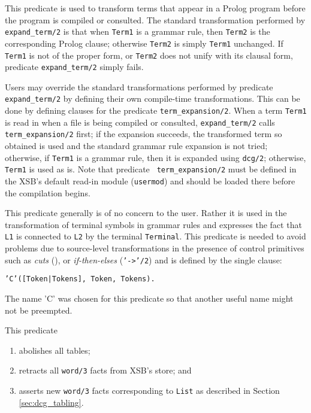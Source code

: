 \begin{description}
    This predicate is used to transform terms that appear in a Prolog program
    before the program is compiled or consulted.
    The standard transformation performed by {\tt expand\_term/2} is that 
    when {\tt Term1} is a grammar rule, then {\tt Term2} is the corresponding
    Prolog clause; otherwise {\tt Term2} is simply {\tt Term1} unchanged. If
    {\tt Term1} is not of the proper form, or {\tt Term2} does not unify with
    its clausal form, predicate {\tt expand\_term/2} simply fails.

    Users may override the standard transformations performed by predicate
    {\tt expand\_term/2} by defining their own compile-time transformations.
    This can be done by defining clauses for the predicate
    {\tt term\_expansion/2}.
    When a term {\tt Term1} is read in when a file is being compiled or 
    consulted, {\tt expand\_term/2} calls {\tt term\_expansion/2} first;
    if the expansion succeeds, the transformed term so obtained is used and 
    the standard grammar rule expansion is not tried; otherwise, if 
    {\tt Term1} is a grammar rule, then it is expanded using {\tt dcg/2}; 
    otherwise, {\tt Term1} is used as is.  Note that predicate {\tt
    term\_expansion/2} must be defined in the XSB's default read-in
    module ({\tt usermod}) and should be loaded there before the compilation
    begins.

    This predicate generally is of no concern to the user.  Rather it is used 
    in the transformation of terminal symbols in 
    grammar rules and expresses the fact that {\tt L1} is connected 
    to {\tt L2} by the terminal {\tt Terminal}. This predicate is
    needed to avoid problems due to source-level
    transformations in the presence of control primitives such as
    {\em cuts} (\cut), or {\em if-then-elses} 
    ({\tt '->'/2}) and is defined by the single clause:
    \begin{center}
                {\tt 'C'([Token|Tokens], Token, Tokens).}
    \end{center}
    The name 'C' was chosen for this predicate so that another useful
    name might not be preempted.

    This predicate 

\begin{enumerate}
\item abolishes all tables;
\item retracts all {\tt word/3} facts from XSB's store; and
\item asserts new {\tt word/3} facts corresponding to {\tt List} as
described in Section \ref{sec:dcg_tabling}.
\end{enumerate}


\end{description}

